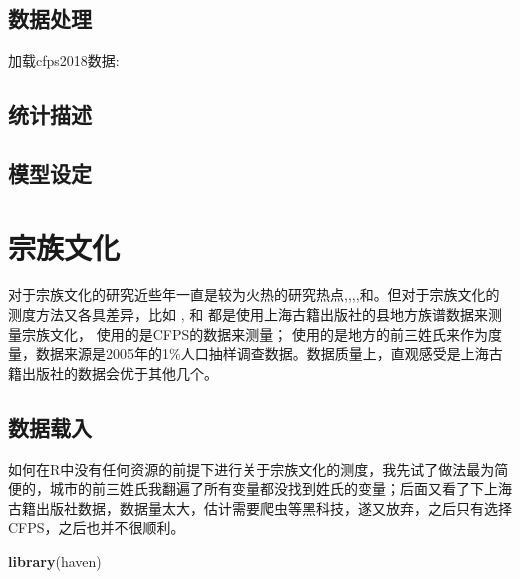 \documentclass[
]{book}
\newenvironment{Shaded}{\begin{snugshade}}{\end{snugshade}}
\newcommand{\FunctionTok}[1]{\textcolor[rgb]{0.13,0.29,0.53}{\textbf{#1}}}
\newcommand{\NormalTok}[1]{#1}
\begin{document}
\hypertarget{ux6570ux636eux5904ux7406}{%
\section{数据处理}\label{ux6570ux636eux5904ux7406}}

加载cfps2018数据:

\hypertarget{ux7edfux8ba1ux63cfux8ff0}{%
\section{统计描述}\label{ux7edfux8ba1ux63cfux8ff0}}

\hypertarget{ux6a21ux578bux8bbeux5b9a}{%
\section{模型设定}\label{ux6a21ux578bux8bbeux5b9a}}

\hypertarget{culture}{%
\chapter{宗族文化}\label{culture}}

对于宗族文化的研究近些年一直是较为火热的研究热点\citep{Cao2022},\citep{Hanetsu2019a},\citep{ZhangShinYi2021a},\citep{ZhangKawagawa2017},\citep{ZHANG2020100}和\citep{FAN2023457}。但对于宗族文化的测度方法又各具差异，比如 \citet{ZHANG2020100}, \citet{Cao2022} 和 \citet{FAN2023457} 都是使用上海古籍出版社的县地方族谱数据来测量宗族文化，\citet{ZhangKawagawa2017} 使用的是CFPS的数据来测量；\citet{ZhangShinYi2021a} 使用的是地方的前三姓氏来作为度量，数据来源是2005年的1\%人口抽样调查数据。数据质量上，直观感受是上海古籍出版社的数据会优于其他几个。

\hypertarget{ux6570ux636eux8f7dux5165}{%
\section{数据载入}\label{ux6570ux636eux8f7dux5165}}

如何在R中没有任何资源的前提下进行关于宗族文化的测度，我先试了做法最为简便的，城市的前三姓氏我翻遍了所有变量都没找到姓氏的变量；后面又看了下上海古籍出版社数据，数据量太大，估计需要爬虫等黑科技，遂又放弃，之后只有选择CFPS，之后也并不很顺利。

\begin{Shaded}
\begin{Highlighting}[]
\FunctionTok{library}\NormalTok{(haven)}
\end{Highlighting}
\end{Shaded}
\end{document}

